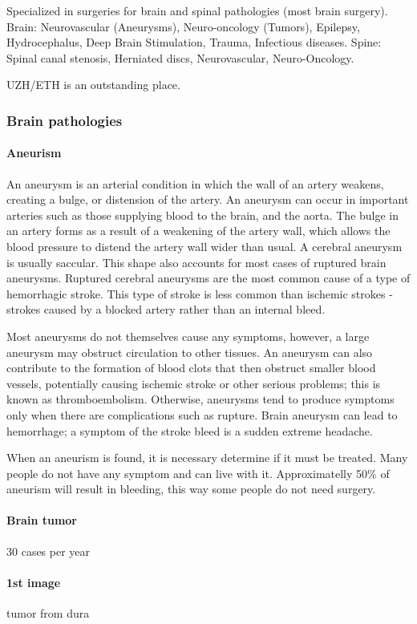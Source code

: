 \documentclass[12pt,article,oneside,a4paper]{memoir}
\begin{document}
Specialized in surgeries for brain and spinal pathologies (most brain surgery).
Brain: Neurovascular (Aneurysms), Neuro-oncology (Tumors), Epilepsy,
Hydrocephalus, Deep Brain Stimulation, Trauma, Infectious diseases.
Spine: Spinal canal stenosis, Herniated discs, Neurovascular, Neuro-Oncology.

UZH/ETH is an outstanding place.

\subsubsection{Brain pathologies}
\paragraph{Aneurism}
An aneurysm is an arterial condition in which the wall of an artery weakens,
creating a bulge, or distension of the artery. An aneurysm can occur in
important arteries such as those supplying blood to the brain, and the aorta.
The bulge in an artery forms as a result of a weakening of the artery wall,
which allows the blood pressure to distend the artery wall wider than usual. A
cerebral aneurysm is usually saccular. This shape also accounts for most cases
of ruptured brain aneurysms. Ruptured cerebral aneurysms are the most common
cause of a type of hemorrhagic stroke. This type of stroke is less common than
ischemic strokes - strokes caused by a blocked artery rather than an internal
bleed.

Most aneurysms do not themselves cause any symptoms, however, a large aneurysm
may obstruct circulation to other tissues. An aneurysm can also contribute to
the formation of blood clots that then obstruct smaller blood vessels,
potentially causing ischemic stroke or other serious problems; this is known as
thromboembolism. Otherwise, aneurysms tend to produce symptoms only when there
are complications such as rupture. Brain aneurysm can lead to hemorrhage; a
symptom of the stroke bleed is a sudden extreme headache.

When an aneurism is found, it is necessary determine if it must be treated.
Many people do not have any symptom and can live with it. Approximatelly 50\%
of aneurism will result in bleeding, this way some people do not need surgery.

\paragraph{Brain tumor} 30 cases per year
\paragraph{1st image} tumor from dura
\end{document}
